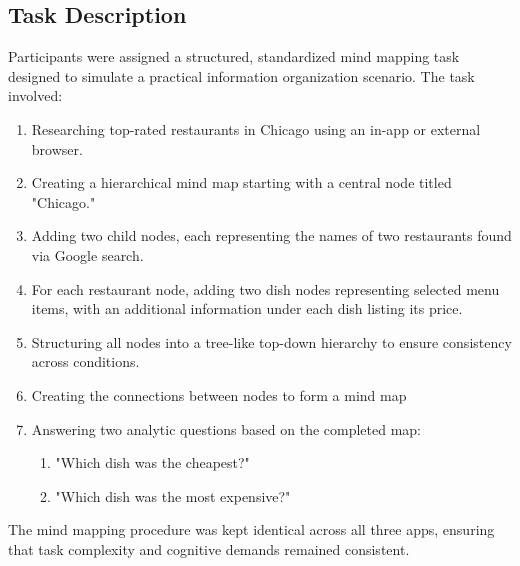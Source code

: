 \documentclass{CPP}
\begin{document}
\subsection{Task Description}
Participants were assigned a structured, standardized mind mapping task designed to simulate a practical information organization scenario. The task involved:
\begin{enumerate}
    \item Researching top-rated restaurants in Chicago using an in-app or external browser.
    \item Creating a hierarchical mind map starting with a central node titled "Chicago."
    \item Adding two child nodes, each representing the names of two restaurants found via Google search.
    \item For each restaurant node, adding two dish nodes representing selected menu items, with an additional information under each dish listing its price.
    \item Structuring all nodes into a tree-like top-down hierarchy to ensure consistency across conditions.
    \item Creating the connections between nodes to form a mind map
    \item Answering two analytic questions based on the completed map:
    \begin{enumerate}
        \item "Which dish was the cheapest?"
        \item "Which dish was the most expensive?"
    \end{enumerate}
\end{enumerate}
The mind mapping procedure was kept identical across all three apps, ensuring that task complexity and cognitive demands remained consistent.

\end{document}
